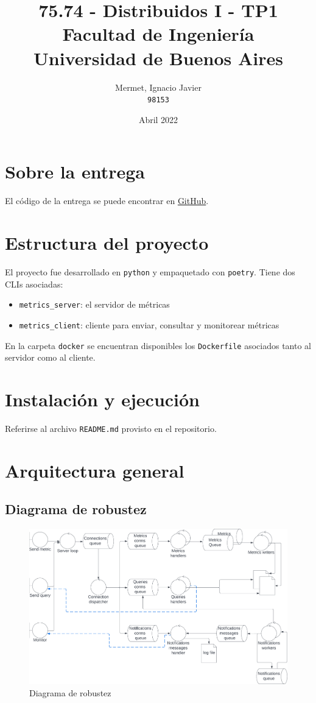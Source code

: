 \documentclass[a4paper,oneside]{article}
\title{75.74 \-- Distribuidos I \-- TP1\\Facultad de Ingeniería\\Universidad de Buenos Aires}
\author{Mermet, Ignacio Javier\\\texttt{98153}}
\date{Abril 2022}
\begin{document}
\maketitle

\newpage

\tableofcontents

\newpage

\section{Sobre la entrega}
El código de la entrega se puede encontrar en \href{https://github.com/CrossNox/7574-TP1}{GitHub}.

\section{Estructura del proyecto}
El proyecto fue desarrollado en \texttt{python}\cite{Python} y empaquetado con \texttt{poetry}\cite{PythonPoetry}. Tiene dos CLIs asociadas:

\begin{itemize}
	\item \texttt{metrics\_server}: el servidor de métricas
	\item \texttt{metrics\_client}: cliente para enviar, consultar y monitorear métricas
\end{itemize}

En la carpeta \texttt{docker} se encuentran disponibles los \texttt{Dockerfile} asociados tanto al servidor como al cliente.

\section{Instalación y ejecución}
Referirse al archivo \texttt{README.md} provisto en el repositorio.

\section{Arquitectura general}
\subsection{Diagrama de robustez} \label{robustez}
\begin{figure}[H]
\centering
\includegraphics[width=\textwidth]{images/diagrama_robustez.png}
\caption{Diagrama de robustez}
\end{figure}
\end{document}
